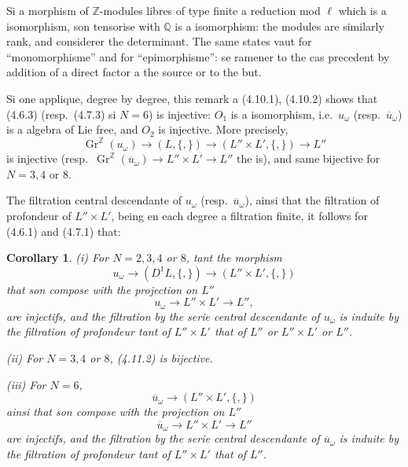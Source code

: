 \documentclass[11pt,a4paper]{article}
\theoremstyle{plain}
\newtheorem{corollary}[theorem]{Corollary}
\theoremstyle{definition}
\newcommand{\Q}{\mathbb{Q}}
\newcommand{\Z}{\mathbb{Z}}
\newcommand{\Gr}{\operatorname{Gr}}
\begin{document}
Si a morphism of $\Z$-modules libres of type finite a reduction mod $\ell$ which is a isomorphism, son tensorise with $\Q$ is a isomorphism: the modules are similarly rank, and considerer the determinant. The same states vaut for ``monomorphisme'' and for ``epimorphisme'': se ramener to the cas precedent by addition of a direct factor a the source or to the but.

Si one applique, degree by degree, this remark a (4.10.1), (4.10.2) shows that (4.6.3) (resp.~(4.7.3) si $N=6$) is injective: $O_1$ is a isomorphism, i.e.~$u_\omega$ (resp.~$\overline{u}_\omega$) is a algebra of Lie free, and $O_2$ is injective. More precisely,
\begin{equation}\label{eq:4.10.4}
\Gr^\Z(u_\omega) \to (L, \{,\}) \to (L'' \times L', \{,\}) \to L''
\end{equation}
is injective (resp.~$\Gr^\Z(\overline{u}_\omega) \to L'' \times L' \to L''$ the is), and same bijective for $N=3,4$ or $8$.

The filtration central descendante of $u_\omega$ (resp.~$\overline{u}_\omega$), ainsi that the filtration of profondeur of $L'' \times L'$, being en each degree a filtration finite, it follows for (4.6.1) and (4.7.1) that:

\begin{corollary}\label{cor:4.11}
\emph{(i)} For $N=2,3,4$ or $8$, tant the morphism
\begin{equation}\label{eq:4.11.1}
u_\omega \to (D^1L, \{,\}) \to (L'' \times L', \{,\})
\end{equation}
that son compose with the projection on $L''$
\begin{equation}\label{eq:4.11.2}
u_\omega \to L'' \times L' \to L'',
\end{equation}
are injectifs, and the filtration by the serie central descendante of $u_\omega$ is induite by the filtration of profondeur tant of $L'' \times L'$ that of $L''$ or $L'' \times L'$ or $L''$.

\emph{(ii)} For $N=3,4$ or $8$, (4.11.2) is bijective.

\emph{(iii)} For $N=6$,
\begin{equation}\label{eq:4.11.3}
\overline{u}_\omega \to (L'' \times L', \{,\})
\end{equation}
ainsi that son compose with the projection on $L''$
\begin{equation}\label{eq:4.11.4}
\overline{u}_\omega \to L'' \times L' \to L''
\end{equation}
are injectifs, and the filtration by the serie central descendante of $\overline{u}_\omega$ is induite by the filtration of profondeur tant of $L'' \times L'$ that of $L''$.
\end{corollary}
\end{document}
